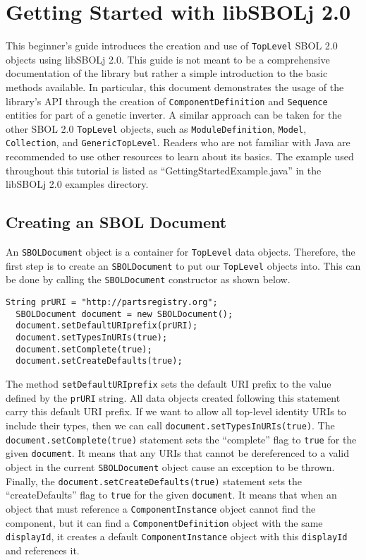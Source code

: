 \section*{Getting Started with libSBOLj 2.0}

This beginner's guide introduces the creation and use of \lstinline+TopLevel+ SBOL 2.0 objects using libSBOLj 2.0.  This guide is not meant to be a comprehensive documentation of the library but rather a simple introduction to the basic methods available.  In particular, this document demonstrates
the usage of the library's API through the creation of
\lstinline+ComponentDefinition+ and \lstinline+Sequence+ entities for
part of a genetic inverter.  A similar approach can be taken for the
other SBOL 2.0 \lstinline+TopLevel+ objects, such as
\lstinline+ModuleDefinition+, \lstinline+Model+,
\lstinline+Collection+, and \lstinline+GenericTopLevel+.  Readers who
are not familiar with Java are recommended to use other resources to
learn about its basics. The example used throughout this tutorial is
listed as ``GettingStartedExample.java'' in the libSBOLj 2.0 examples
directory.

\subsection*{Creating an SBOL Document}
An \lstinline+SBOLDocument+ object is a container for \lstinline+TopLevel+ data objects.  Therefore, the first step is to create an \lstinline+SBOLDocument+ to put our \lstinline+TopLevel+ objects into.
This can be done by calling the \lstinline+SBOLDocument+ constructor as shown below. 

\begin{minipage}{0.95\textwidth} 
\begin{lstlisting}[basicstyle=\footnotesize\ttfamily]
  String prURI = "http://partsregistry.org"; 
  SBOLDocument document = new SBOLDocument();		
  document.setDefaultURIprefix(prURI);
  document.setTypesInURIs(true);
  document.setComplete(true);
  document.setCreateDefaults(true);
\end{lstlisting}
\end{minipage}

The method \lstinline+setDefaultURIprefix+ sets the
default URI prefix to the value defined by the \lstinline+prURI+
string. All data objects created following this statement carry this
default URI prefix. If we want to allow all top-level identity URIs to
include their types, then we can call \lstinline+document.setTypesInURIs(true)+.
The \lstinline+document.setComplete(true)+ statement sets the ``complete'' flag
to \lstinline+true+ for the given \lstinline+document+. It means that
any URIs that cannot be dereferenced to a valid object in the current
\lstinline+SBOLDocument+ object cause an exception to be thrown.
Finally, the \lstinline+document.setCreateDefaults(true)+ statement
sets the ``createDefaults'' flag to \lstinline+true+ for the given
\lstinline+document+.  It means that when an object that must
reference a \lstinline+ComponentInstance+ object cannot find the
component, but it can find a \lstinline+ComponentDefinition+ object
with the same \lstinline+displayId+, it creates a default \lstinline+ComponentInstance+ object with this \lstinline+displayId+ and references it.

